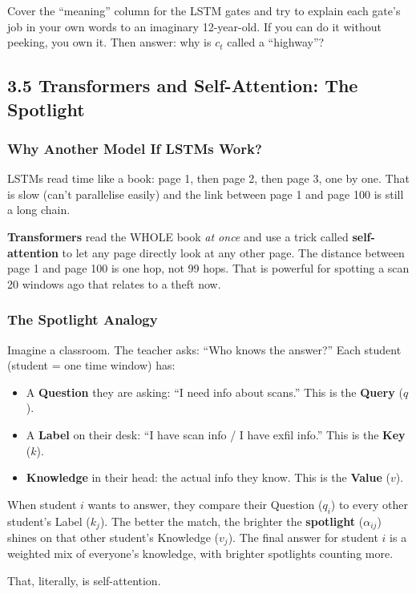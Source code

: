 \documentclass[11pt,a4paper]{article}
\begin{document}
\begin{yourturn}
Cover the ``meaning'' column for the LSTM gates and try to explain each gate's
job in your own words to an imaginary 12-year-old. If you can do it without
peeking, you own it. Then answer: why is $c_t$ called a ``highway''?
\end{yourturn}

\subsection{3.5 Transformers and Self-Attention: The Spotlight}
\label{sec:transformer}

\subsubsection{Why Another Model If LSTMs Work?}

LSTMs read time like a book: page 1, then page 2, then page 3, one by one.
That is slow (can't parallelise easily) and the link between page 1 and page
100 is still a long chain.

\textbf{Transformers} read the WHOLE book \emph{at once} and use a trick called
\textbf{self-attention} to let any page directly look at any other page. The
distance between page 1 and page 100 is one hop, not 99 hops. That is powerful
for spotting a scan 20 windows ago that relates to a theft now.

\subsubsection{The Spotlight Analogy}

\begin{imaginebox}
Imagine a classroom. The teacher asks: ``Who knows the answer?'' Each student
(student = one time window) has:

\begin{itemize}[leftmargin=1.6em,itemsep=1pt]
  \item A \textbf{Question} they are asking: ``I need info about scans.'' This
        is the \textbf{Query} ($q$).
  \item A \textbf{Label} on their desk: ``I have scan info / I have exfil info.''
        This is the \textbf{Key} ($k$).
  \item \textbf{Knowledge} in their head: the actual info they know. This is the
        \textbf{Value} ($v$).
\end{itemize}

When student $i$ wants to answer, they compare their Question ($q_i$) to every
other student's Label ($k_j$). The better the match, the brighter the
\textbf{spotlight} ($ \alpha_{ij}$) shines on that other student's Knowledge
($v_j$). The final answer for student $i$ is a weighted mix of everyone's
knowledge, with brighter spotlights counting more.

That, literally, is self-attention.
\end{imaginebox}
\end{document}
